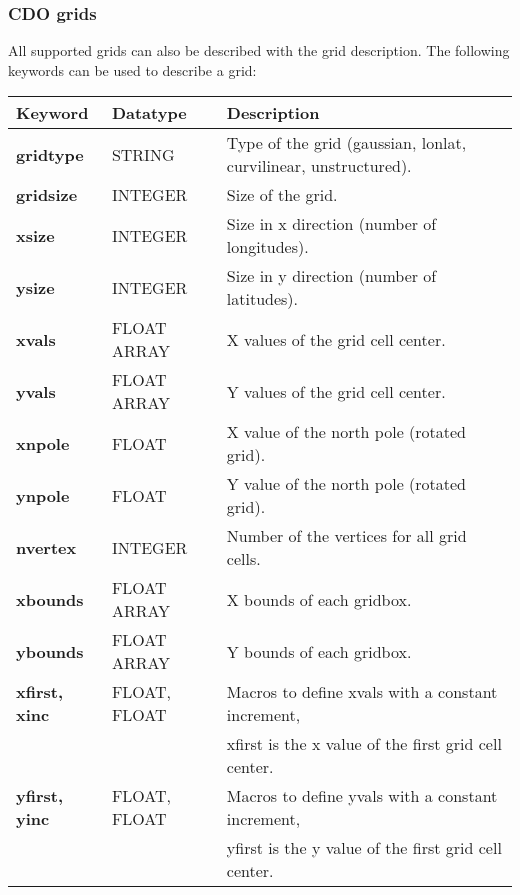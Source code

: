 \subsubsection{CDO grids}

All supported grids can also be described with the {\CDO} grid description.
The following keywords can be used to describe a grid:

\vspace{3mm}
\begin{tabular}[b]{lll}
Keyword           & Datatype     & Description \\ \hline
\bf{gridtype}     & STRING       & Type of the grid (gaussian, lonlat, curvilinear, unstructured). \\
\bf{gridsize}     & INTEGER      & Size of the grid. \\
\bf{xsize}        & INTEGER      & Size in x direction (number of longitudes). \\
\bf{ysize}        & INTEGER      & Size in y direction (number of latitudes). \\
\bf{xvals}        & FLOAT ARRAY  & X values of the grid cell center. \\
\bf{yvals}        & FLOAT ARRAY  & Y values of the grid cell center.\\
\bf{xnpole}       & FLOAT        & X value of the north pole (rotated grid). \\
\bf{ynpole}       & FLOAT        & Y value of the north pole (rotated grid). \\
\bf{nvertex}      & INTEGER      & Number of the vertices for all grid cells. \\
\bf{xbounds}      & FLOAT ARRAY  & X bounds of each gridbox. \\
\bf{ybounds}      & FLOAT ARRAY  & Y bounds of each gridbox. \\
\bf{xfirst, xinc} & FLOAT, FLOAT & Macros to define xvals with a constant increment, \\
                         &                         & xfirst is the x value of the first grid cell center. \\
\bf{yfirst, yinc} & FLOAT, FLOAT & Macros to define yvals with a constant increment, \\
                         &                         & yfirst is the y value of the first grid cell center. \\
\end{tabular}

